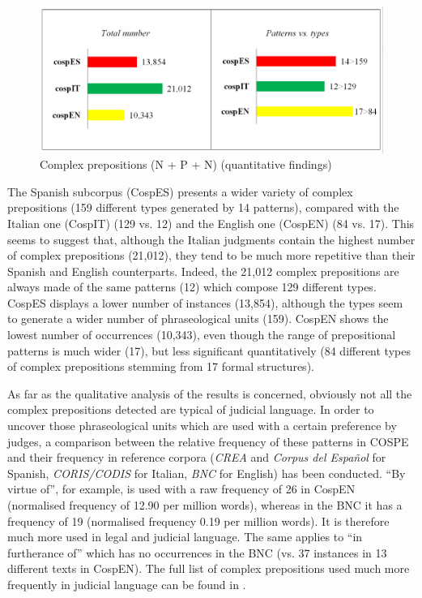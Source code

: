 \documentclass[output=paper]{LSP/langsci}
\begin{document}
\begin{figure}
\includegraphics[width=1.0\textwidth]{./figures/1-1.png}
\caption{Complex prepositions (N + P + N) (quantitative findings)}
\end{figure}

The Spanish subcorpus (CospES) presents a wider variety of complex prepositions (159 different types generated by 14 patterns), compared with the Italian one (CospIT) (129 vs. 12) and the English one (CospEN) (84 vs. 17). This seems to suggest that, although the Italian judgments contain the highest number of complex prepositions (21,012), they tend to be much more repetitive than their Spanish and English counterparts. Indeed, the 21,012 complex prepositions are always made of the same patterns (12) which compose 129 different types. CospES displays a lower number of instances (13,854), although the types seem to generate a wider number of phraseological units (159). CospEN shows the lowest number of occurrences (10,343), even though the range of prepositional patterns is much wider (17), but less significant quantitatively (84 different types of complex prepositions stemming from 17 formal structures).

As far as the qualitative analysis of the results is concerned, obviously not all the complex prepositions detected are typical of judicial language. In order to uncover those phraseological units which are used with a certain preference by judges, a comparison between the relative frequency of these patterns in COSPE and their frequency in reference corpora (\textit{CREA} and \textit{Corpus del Español} for Spanish, \textit{CORIS/CODIS} for Italian, \textit{BNC} for English) has been conducted. “By virtue of”, for example, is used with a raw frequency of 26 in CospEN (normalised frequency of 12.90 per million words), whereas in the BNC it has a frequency of 19 (normalised frequency 0.19 per million words). It is therefore much more used in legal and judicial language. The same applies to “in furtherance of” which has no occurrences in the BNC (vs. 37 instances in 13 different texts in CospEN). The full list of complex prepositions used much more frequently in judicial language can be found in \citet[200-205]{Pontrandolfo2013b}.
\end{document}
